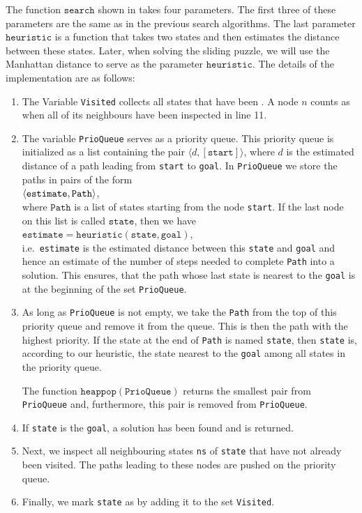 The function $\texttt{search}$ shown in  takes four parameters.  The
first three of these parameters are the same as in the previous search algorithms.  The last parameter
$\texttt{heuristic}$ is a function that takes two states and then estimates the distance between these states.
Later, when solving the sliding puzzle, we will use the Manhattan distance to serve as the parameter
$\texttt{heuristic}$.  The details of the implementation are as follows:
\begin{enumerate}
\item The Variable \texttt{Visited} collects all states that have been .  A node $n$ counts as
       when all of its neighbours have been inspected in line 11.
\item The variable \texttt{PrioQueue} serves as a priority queue.  This priority queue is initialized as a
      list containing the pair $\langle d, [\mathtt{start}] \rangle$, where $d$ is the estimated distance of a path
      leading from \texttt{start} to \texttt{goal}.  In \texttt{PrioQueue} we store the paths 
      in pairs of the form
      \\[0.2cm]
      \hspace*{1.3cm}
      $\pair(\mathtt{estimate}, \mathtt{Path})$,
      \\[0.2cm]
      where $\texttt{Path}$ is a list of states starting from the node \texttt{start}.  If the last node on
      this list is called $\texttt{state}$, then we have
      \\[0.2cm]
      \hspace*{1.3cm}
      $\mathtt{estimate} = \mathtt{heuristic}(\mathtt{state}, \mathtt{goal})$,
      \\[0.2cm] 
      i.e.~\texttt{estimate} is the estimated distance between this \texttt{state} and \texttt{goal} and hence
      an estimate of the number of steps needed to complete \texttt{Path} into a solution.  This ensures,
      that the path whose last state is nearest to the \texttt{goal} is at the beginning of the set
      \texttt{PrioQueue}. 
\item As long as \texttt{PrioQueue} is not empty, we take the \texttt{Path} from the top of this
      priority queue and remove it from the queue.  This is then the path with the highest priority.
      If the state at the end of \texttt{Path} is named \texttt{state}, then \texttt{state} is, according to
      our heuristic, the state nearest to the \texttt{goal} among all states in the priority queue. 

      The function $\texttt{heappop}(\mathtt{PrioQueue})$ returns the smallest pair from 
      \texttt{PrioQueue} and, furthermore, this pair is removed from \texttt{PrioQueue}.
\item If \texttt{state} is the \texttt{goal}, a solution has been found and is returned.  
\item Next, we inspect all neighbouring states \texttt{ns} of \texttt{state} that have not already been
      visited.  The paths leading to these nodes are pushed on the priority queue.
\item Finally, we mark \texttt{state} as  by adding it to the set \texttt{Visited}.
\end{enumerate}
